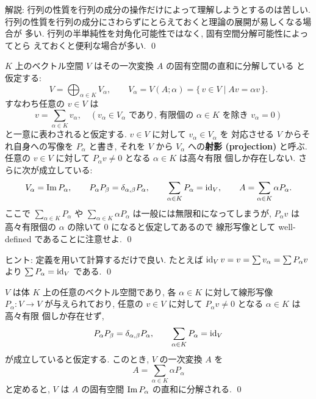 \documentclass[12pt,twoside]{jarticle}
\begin{document}
\medskip
\noindent
解説: 行列の性質を行列の成分の操作だけによって理解しようとするのは苦しい.
行列の性質を行列の成分にさわらずにとらえておくと理論の展開が易しくなる場合が
多い.  行列の半単純性を対角化可能性ではなく, 固有空間分解可能性によってとら
えておくと便利な場合が多い.
\qed


\begin{question}
  $K$ 上のベクトル空間 $V$ はその一次変換 $A$ の固有空間の直和に分解している
  と仮定する:
  \begin{equation*}
    V = \bigoplus_{\alpha\in K} V_\alpha,
    \qquad
    V_\alpha = V(A;\alpha) = \{\,v\in V\mid Av=\alpha v\,\}.
  \end{equation*}
  すなわち任意の $v\in V$ は 
  \begin{equation*}
    v = \sum_{\alpha\in K} v_\alpha, 
    \quad
    (\text{$v_\alpha\in V_\alpha$ であり, 
      有限個の $\alpha\in K$ を除き $v_\alpha=0$})
  \end{equation*}
  と一意に表わされると仮定する.  $v\in V$ に対して $v_\alpha\in V_\alpha$ を
  対応させる $V$ からそれ自身への写像を $P_\alpha$ と書き, 
  それを $V$ から $V_\alpha$ への{\bf 射影 (projection)} と呼ぶ.
  任意の $v\in V$ に対して $P_\alpha v\ne 0$ となる $\alpha\in K$ は高々有限
  個しか存在しない. さらに次が成立している:
  \begin{equation*}
    V_\alpha = \mathop{\mathrm{Im}}\nolimits P_\alpha,
    \qquad
    P_\alpha P_{\beta} = \delta_{\alpha,\beta} P_\alpha,
    \qquad
    \sum_{\alpha\in K} P_\alpha = \mathop{\mathrm{id}}\nolimits_V,
    \qquad
    A = \sum_{\alpha\in K} \alpha P_\alpha.
  \end{equation*}
  ここで $\sum_{\alpha\in K} P_\alpha$ 
  や $\sum_{\alpha\in K} \alpha P_\alpha$ は一般には無限和になってしまうが,
  $P_\alpha v$ は高々有限個の $\alpha$ の除いて $0$ になると仮定してあるので 
  線形写像として well-defined であることに注意せよ. 
  \qed
\end{question}

\noindent
ヒント: 定義を用いて計算するだけで良い.  
たとえば $\mathop{\mathrm{id}}\nolimits_V v = v = \sum v_\alpha = \sum P_\alpha v$ 
より $\sum P_\alpha = \mathop{\mathrm{id}}\nolimits_V$ である.
\qed


\begin{question}
  $V$ は体 $K$ 上の任意のベクトル空間であり, 
  各 $\alpha\in K$ に対して線形写像 $P_\alpha:V\to V$ が与えられており,
  任意の $v\in V$ に対して $P_\alpha v\ne 0$ となる $\alpha\in K$ は高々有限
  個しか存在せず, 
  \begin{equation*}
    P_\alpha P_{\beta} = \delta_{\alpha,\beta} P_\alpha,
    \qquad
    \sum_{\alpha\in K} P_\alpha = \mathop{\mathrm{id}}\nolimits_V
  \end{equation*}
  が成立していると仮定する.  このとき, $V$ の一次変換 $A$ を
  \begin{equation*}
    A = \sum_{\alpha\in K} \alpha P_\alpha
  \end{equation*}
  と定めると, $V$ は $A$ の固有空間 $\mathop{\mathrm{Im}}\nolimits P_\alpha$ の直和に分解される. \qed
\end{question}
\end{document}
